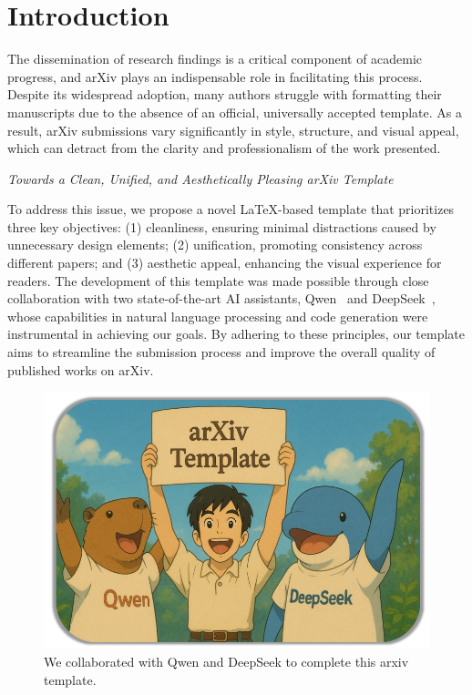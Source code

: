 \vspace{-4mm}
\section{Introduction}

The dissemination of research findings is a critical component of academic progress, and arXiv plays an indispensable role in facilitating this process. Despite its widespread adoption, many authors struggle with formatting their manuscripts due to the absence of an official, universally accepted template. As a result, arXiv submissions vary significantly in style, structure, and visual appeal, which can detract from the clarity and professionalism of the work presented.

\begin{center}
\emph{
Towards a Clean, Unified, and Aesthetically Pleasing arXiv Template
}
\end{center}

To address this issue, we propose a novel LaTeX-based template that prioritizes three key objectives: (1) cleanliness, ensuring minimal distractions caused by unnecessary design elements; (2) unification, promoting consistency across different papers; and (3) aesthetic appeal, enhancing the visual experience for readers. The development of this template was made possible through close collaboration with two state-of-the-art AI assistants, Qwen~\cite{hui2024qwen2} and DeepSeek~\cite{guo2025deepseek}, whose capabilities in natural language processing and code generation were instrumental in achieving our goals. By adhering to these principles, our template aims to streamline the submission process and improve the overall quality of published works on arXiv.

\begin{figure}[h]
    \centering
    \includegraphics[width=\linewidth]{figures/figure1.png}
    \vspace{-10mm}
    \caption{We collaborated with Qwen and DeepSeek to complete this arxiv template.}
    \label{fig:overall_figure}
\end{figure}

\label{sec:intro}
\vspace{-1mm}
